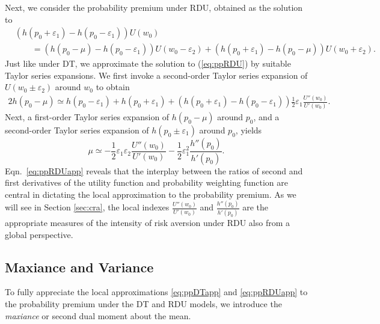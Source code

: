 \documentclass[11pt]{article}
\begin{document}
Next, we consider the probability premium under RDU,
obtained as the solution to
\begin{align}
&\left(h(p_{0}+\varepsilon_{1})-h(p_{0}-\varepsilon_{1})\right)U(w_{0})\nonumber\\
&\qquad=\left(h(p_{0}-\mu)-h(p_{0}-\varepsilon_{1})\right)U(w_{0}-\varepsilon_{2})
+\left(h(p_{0}+\varepsilon_{1})-h(p_{0}-\mu)\right)U(w_{0}+\varepsilon_{2}).
\label{eq:ppRDU}
\end{align}
Just like under DT, we approximate the solution to (\ref{eq:ppRDU}) by suitable Taylor series expansions.
We first invoke a second-order Taylor series expansion of $U(w_{0}\pm \varepsilon_{2})$ around $w_{0}$
to obtain
\begin{align*}
2h(p_{0}-\mu)\simeq h(p_{0}-\varepsilon_{1})+h(p_{0}+\varepsilon_{1})+\left(h(p_{0}+\varepsilon_{1})-h(p_{0}-\varepsilon_{1})\right)\frac{1}{2}\varepsilon_{1}\frac{U''(w_{0})}{U'(w_{0})}.
\end{align*}
Next, a first-order Taylor series expansion of $h(p_{0}-\mu)$ around $p_{0}$,
and a second-order Taylor series expansion of $h(p_{0}\pm\varepsilon_{1})$ around $p_{0}$,
yields
\begin{equation}
\mu\simeq-\frac{1}{2}\varepsilon_{1}\varepsilon_{2}\frac{U''(w_{0})}{U'(w_{0})}-\frac{1}{2}\varepsilon_{1}^{2}\frac{h''(p_{0})}{h'(p_{0})}.
\label{eq:ppRDUapp}
\end{equation}
Eqn.~\eqref{eq:ppRDUapp} reveals that the interplay between the ratios of second and first derivatives
of the utility function and probability weighting function
are central in dictating the local approximation to the probability premium.
As we will see in Section \ref{sec:cra}, the
local indexes $\tfrac{U''(w_{0})}{U'(w_{0})}$ and $\tfrac{h''(p_{0})}{h'(p_{0})}$
are the appropriate measures of the intensity of risk aversion under RDU
also from a global perspective.

\subsection{Maxiance and Variance}\label{sec:dualmom}

To fully appreciate the local approximations \eqref{eq:ppDTapp} and \eqref{eq:ppRDUapp} to the probability premium
under the DT and RDU models,
we introduce the \textit{maxiance} or second dual moment about the mean.
\end{document}
